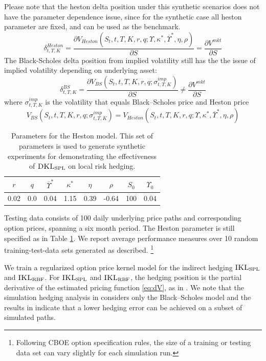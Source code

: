 \documentclass[letterpaper,12pt,titlepage,oneside,final]{book}
\numberwithin{equation}{section}
\theoremstyle{definition}
\newcommand{\Vmkt}{V^{mkt}}
\newcommand{\DKLs}{\bf\textsc{DKL}_{\text{SPL}}}
\newcommand{\IKLs}{\bf\textsc{IKL}_{\text{SPL}}}
\newcommand{\IKLg}{\bf\textsc{IKL}_{\text{RBF}}}
\begin{document}
 Please note that the heston delta position under this synthetic scenarios does not have the parameter dependence issue, since for the synthetic case all heston parameter are fixed, and can be used as the benchmark.
 \[
	 \delta^{Heston}_{t,T,K}=\frac{ \partial V_{Heston}(S_t,t,T,K,r,q;\Upsilon,\kappa^*,\overline{\Upsilon}^*,\eta,\rho)}{\partial S}=\frac{\partial \Vmkt}{\partial S}
 \] 
 The Black-Scholes delta position from implied volatility still has the the issue of implied volatility depending on underlying asset:
 \[
	 \delta^{BS}_{t,T,K}=\frac{ \partial V_{BS}(S_t,t,T,K,r,q;\sigma^{imp}_{t,T,K})}{\partial S} \neq \frac{\partial \Vmkt}{\partial S}
 \] 
 where $\sigma^{imp}_{t,T,K}$ is the volatility that equals Black–Scholes price and Heston price
 \[
	 V_{BS}(S_t,t,T,K,r,q;\sigma^{imp}_{t,T,K})=V_{Heston}(S_t,t,T,K,r,q;\Upsilon,\kappa^*,\overline{\Upsilon}^*,\eta,\rho)
 \]

 \begin{table}[htp!]
\begin{center}
\begin{tabular}{|c|c|c|c|c|c|c|c|}
\hline
 $r$ &$q$& $\overline{\Upsilon}^*$  & $\kappa^*$ & $\eta$ & $\rho$ & $S_0$ & $\Upsilon_0$  \\ \hline
 0.02&0.0&0.04                  & 1.15   & 0.39  & -0.64 & 100 &0.04 \\    \hline
\end{tabular}
\end{center}

\caption{Parameters for the Heston model. This set of parameters is used to generate synthetic experiments for demonstrating the effectiveness of $\DKLs$ on local risk hedging.}
\label{para}
\end{table}



Testing data consists of 100 daily underlying price paths and corresponding option prices, spanning a six month period. The Heston parameter is still specified as in Table \ref{para}. We report average performance measures over 10 random training-test-data sets generated as described. \footnote{Following CBOE option specification rules, the size of a training or testing data set can vary slightly for each simulation run.}



We train a regularized option price kernel model for the indirect hedging $\IKLs$ and $\IKLg$. For $\IKLs$ and $\IKLg$,
the hedging position is  the partial derivative of the estimated pricing function  \eqref{eq:dV},  as in \citep{hutchinson}. We note that the simulation hedging analysis in \cite{hutchinson} considers only the Black–Scholes model and the results in \citep{hutchinson} indicate that a lower hedging error can be achieved on a subset of simulated paths.
\end{document}
